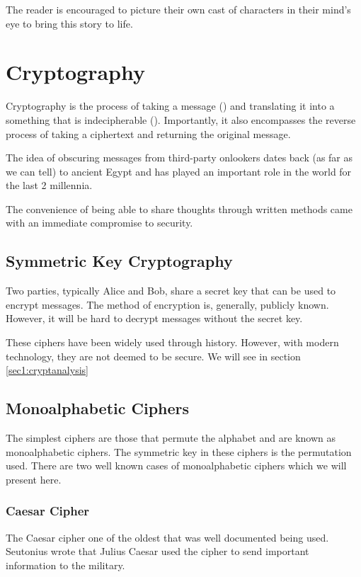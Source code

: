 The reader is encouraged to picture their own cast of characters in their mind's eye to bring this story to life.

\section{Cryptography}
\label{sec1:crypto}

Cryptography is the process of taking a message () and translating it into a something that is indecipherable (). Importantly, it also encompasses the reverse process of taking a ciphertext and returning the original message. 

The idea of obscuring messages from third-party onlookers dates back (as far as we can tell) to ancient Egypt and has played an important role in the world for the last 2 millennia. 

The convenience of being able to share thoughts through written methods came with an immediate compromise to security.

\subsection{Symmetric Key Cryptography}

Two parties, typically Alice and Bob, share a secret key that can be used to encrypt messages. The method of encryption is, generally, publicly known. However, it will be hard to decrypt messages without the secret key.

These ciphers have been widely used through history. However, with modern technology, they are not deemed to be secure. We will see in section \ref{sec1:cryptanalysis}

\subsection{Monoalphabetic Ciphers}

The simplest ciphers are those that permute the alphabet and are known as {\color{bristol-red} monoalphabetic ciphers}. The symmetric key in these 	ciphers is the permutation used. There are two well known cases of monoalphabetic ciphers which we will present here. 

\subsubsection*{Caesar Cipher}

The Caesar cipher one of the oldest that was well documented being used. Seutonius wrote that Julius Caesar used the cipher to send important information to the military. 

